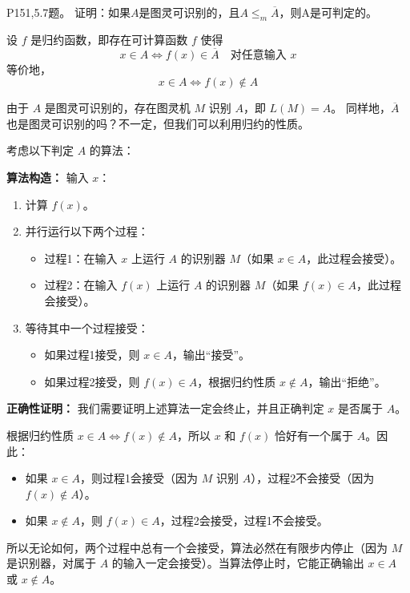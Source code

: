 \documentclass[11pt,addpoints,answers]{exam}
\begin{document}
\begin{questions}
\question P151,5.7题。
证明：如果$A$是图灵可识别的，且$A\leq _{m} \overline{A}$，则A是可判定的。
\begin{solution}
	设 $f$ 是归约函数，即存在可计算函数 $f$ 使得
    \[
    x \in A \iff f(x) \in \overline{A} \quad \text{对任意输入 } x
    \]
    等价地，
    \[
    x \in A \iff f(x) \notin A
    \]
    
    由于 $A$ 是图灵可识别的，存在图灵机 $M$ 识别 $A$，即 $L(M) = A$。  
    同样地，$\overline{A}$ 也是图灵可识别的吗？不一定，但我们可以利用归约的性质。
    
    考虑以下判定 $A$ 的算法：
    
    \noindent \textbf{算法构造：}
    输入 $x$：
    \begin{enumerate}
        \item 计算 $f(x)$。
        \item 并行运行以下两个过程：
        \begin{itemize}
            \item 过程1：在输入 $x$ 上运行 $A$ 的识别器 $M$（如果 $x \in A$，此过程会接受）。
            \item 过程2：在输入 $f(x)$ 上运行 $A$ 的识别器 $M$（如果 $f(x) \in A$，此过程会接受）。
        \end{itemize}
        \item 等待其中一个过程接受：
        \begin{itemize}
            \item 如果过程1接受，则 $x \in A$，输出“接受”。
            \item 如果过程2接受，则 $f(x) \in A$，根据归约性质 $x \notin A$，输出“拒绝”。
        \end{itemize}
    \end{enumerate}
    
    \noindent \textbf{正确性证明：}
    我们需要证明上述算法一定会终止，并且正确判定 $x$ 是否属于 $A$。
    
    根据归约性质 $x \in A \iff f(x) \notin A$，所以 $x$ 和 $f(x)$ 恰好有一个属于 $A$。因此：
    \begin{itemize}
        \item 如果 $x \in A$，则过程1会接受（因为 $M$ 识别 $A$），过程2不会接受（因为 $f(x) \notin A$）。
        \item 如果 $x \notin A$，则 $f(x) \in A$，过程2会接受，过程1不会接受。
    \end{itemize}
    
    所以无论如何，两个过程中总有一个会接受，算法必然在有限步内停止（因为 $M$ 是识别器，对属于 $A$ 的输入一定会接受）。当算法停止时，它能正确输出 $x \in A$ 或 $x \notin A$。
    

\end{solution}
\end{questions}
\end{document}

